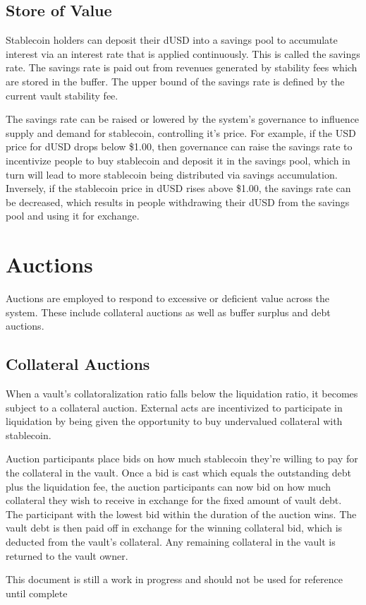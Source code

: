 \documentclass[12pt]{article}
\begin{document}
\subsection{Store of Value}
Stablecoin holders can deposit their dUSD into a savings pool to accumulate interest via an interest rate that is applied continuously. This is called the savings rate. The savings rate is paid out from revenues generated by stability fees which are stored in the buffer. The upper bound of the savings rate is defined by the current vault stability fee.

The savings rate can be raised or lowered by the system's governance to influence supply and demand for stablecoin, controlling it's price. For example, if the USD price for dUSD drops below \$1.00, then governance can raise the savings rate to incentivize people to buy stablecoin and deposit it in the savings pool, which in turn will lead to more stablecoin being distributed via savings accumulation. Inversely, if the stablecoin price in dUSD rises above \$1.00, the savings rate can be decreased, which results in people withdrawing their dUSD from the savings pool and using it for exchange.

\section{Auctions}

Auctions are employed to respond to excessive or deficient value across the system. These include collateral auctions as well as buffer surplus and debt auctions.

\subsection{Collateral Auctions}

When a vault's collatoralization ratio falls below the liquidation ratio, it becomes subject to a collateral auction. External acts are incentivized to participate in liquidation by being given the opportunity to buy undervalued collateral with stablecoin.

Auction participants place bids on how much stablecoin they're willing to pay for the collateral in the vault. Once a bid is cast which equals the outstanding debt plus the liquidation fee, the auction participants can now bid on how much collateral they wish to receive in exchange for the fixed amount of vault debt. The participant with the lowest bid within the duration of the auction wins. The vault debt is then paid off in exchange for the winning collateral bid, which is deducted from the vault's collateral. Any remaining collateral in the vault is returned to the vault owner.


\color{red} This document is still a work in progress and should not be used for reference until complete
\end{document}
